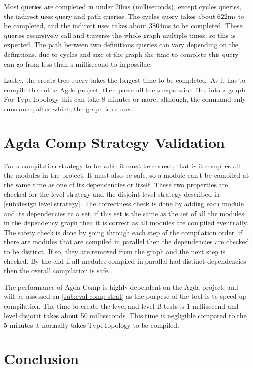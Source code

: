 Most queries are completed in under 20ms (milliseconds), except cycles queries,
the indirect uses query and path queries. The cycles query takes about 622ms to
be completed, and the indirect uses takes about 3804ms to be completed. These
queries recursively call and traverse the whole graph multiple times, so this
is expected. The path between two definitions queries can vary depending on the
definitions, due to cycles and size of the graph the time to complete this
query can go from less than a millisecond to impossible.

Lastly, the create tree query takes the longest time to be completed. As it has
to compile the entire Agda project, then parse all the s-expression files into
a graph. For TypeTopology this can take 8 minutes or more, although, the
command only runs once, after which, the graph is re-used.

\section{Agda Comp Strategy Validation}

For a compilation strategy to be valid it must be correct, that is it compiles
all the modules in the project. It must also be safe, so a module can't be
compiled at the same time as one of its dependencies or itself. These two
properties are checked for the level strategy and the disjoint level strategy
described in \cref{sub:design level strategy}. The correctness check is done by
adding each module and its dependencies to a set, if this set is the same as
the set of all the modules in the dependency graph then it is correct as all
modules are compiled eventually. The safety check is done by going through each
step of the compilation order, if there are modules that are compiled in
parallel then the dependencies are checked to be distinct. If so, they are
removed from the graph and the next step is checked. By the end if all modules
compiled in parallel had distinct dependencies then the overall compilation is
safe.

The performance of Agda Comp is highly dependent on the Agda project, and will
be assessed on \cref{sub:eval comp strat} as the purpose of the tool is to
speed up compilation. The time to create the level and level B tests is
1-millisecond and level disjoint takes about 50 milliseconds. This time is
negligible compared to the 5 minutes it normally takes TypeTopology to be
compiled.

\section{Conclusion}

